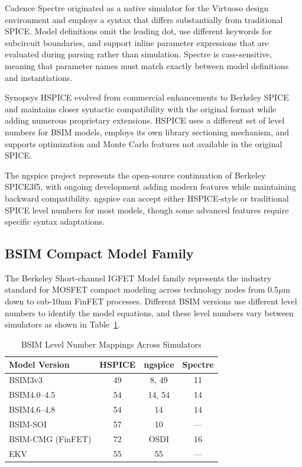 \documentclass[conference]{IEEEtran}
\begin{document}
Cadence Spectre originated as a native simulator for the Virtuoso design environment and employs a syntax that differs substantially from traditional SPICE. Model definitions omit the leading dot, use different keywords for subcircuit boundaries, and support inline parameter expressions that are evaluated during parsing rather than simulation. Spectre is case-sensitive, meaning that parameter names must match exactly between model definitions and instantiations.

Synopsys HSPICE evolved from commercial enhancements to Berkeley SPICE and maintains closer syntactic compatibility with the original format while adding numerous proprietary extensions. HSPICE uses a different set of level numbers for BSIM models, employs its own library sectioning mechanism, and supports optimization and Monte Carlo features not available in the original SPICE.

The ngspice project represents the open-source continuation of Berkeley SPICE3f5, with ongoing development adding modern features while maintaining backward compatibility. ngspice can accept either HSPICE-style or traditional SPICE level numbers for most models, though some advanced features require specific syntax adaptations.

\subsection{BSIM Compact Model Family}

The Berkeley Short-channel IGFET Model family represents the industry standard for MOSFET compact modeling across technology nodes from 0.5$\mu$m down to sub-10nm FinFET processes. Different BSIM versions use different level numbers to identify the model equations, and these level numbers vary between simulators as shown in Table~\ref{tab:levels}.

\begin{table}[htbp]
\caption{BSIM Level Number Mappings Across Simulators}
\label{tab:levels}
\centering
\begin{tabular}{lccc}
\toprule
\textbf{Model Version} & \textbf{HSPICE} & \textbf{ngspice} & \textbf{Spectre} \\
\midrule
BSIM3v3 & 49 & 8, 49 & 11 \\
BSIM4.0--4.5 & 54 & 14, 54 & 14 \\
BSIM4.6--4.8 & 54 & 14 & 14 \\
BSIM-SOI & 57 & 10 & --- \\
BSIM-CMG (FinFET) & 72 & OSDI & 16 \\
EKV & 55 & 55 & --- \\
\bottomrule
\end{tabular}
\end{table}
\end{document}
